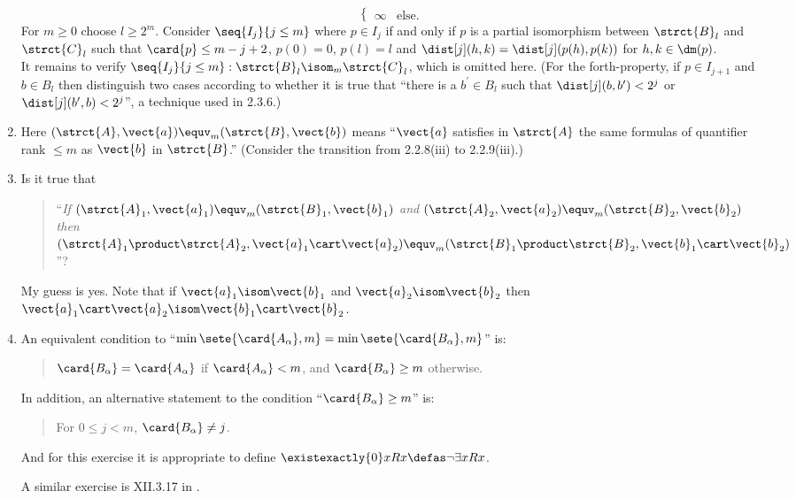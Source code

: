 \begin{enumerate}[1.]
\[\begin{cases}
\infty & \mbox{else}.
\end{cases}
\]
For $m \geq 0$ choose $l \geq 2^m$. Consider $\seq{I_j}{j \leq m}$ where $p \in I_j$ if and only if $p$ is a partial isomorphism between $\strct{B}_l$ and $\strct{C}_l$ such that $\card{p} \leq m - j + 2$, $p(0) = 0$, $p(l) = l$ and $\dist[j](h, k) = \dist[j](p(h), p(k))$ for $h, k \in \dm(p)$.
\medskip\\
It remains to verify $\seq{I_j}{j \leq m} : \strct{B}_l \isom_m \strct{C}_l$, which is omitted here. (For the forth-property, if $p \in I_{j + 1}$ and $b \in B_l$ then distinguish two cases according to whether it is true that ``there is a $b^\prime \in B_l$ such that $\dist[j](b, b^\prime) < 2^j$ or $\dist[j](b^\prime, b) < 2^j$'', a technique used in 2.3.6.)
%
\item {} Here $(\strct{A}, \vect{a}) \equv_m (\strct{B}, \vect{b})$ means ``$\vect{a}$ satisfies in $\strct{A}$ the same formulas of quantifier rank $\leq m$ as $\vect{b}$ in $\strct{B}$.'' (Consider the transition from 2.2.8(iii) to 2.2.9(iii).)
%
\item {} Is it true that
\begin{quote}
``\emph{If $(\strct{A}_1, \vect{a}_1) \equv_m (\strct{B}_1, \vect{b}_1)$ and $(\strct{A}_2, \vect{a}_2) \equv_m (\strct{B}_2, \vect{b}_2)$ then $(\strct{A}_1 \product \strct{A}_2, \vect{a}_1 \cart \vect{a}_2) \equv_m (\strct{B}_1 \product \strct{B}_2, \vect{b}_1 \cart \vect{b}_2)$}''?
\end{quote}
My guess is yes. Note that if $\vect{a}_1 \isom \vect{b}_1$ and $\vect{a}_2 \isom \vect{b}_2$ then $\vect{a}_1 \cart \vect{a}_2 \isom \vect{b}_1 \cart \vect{b}_2$.
%
\item {} An equivalent condition to ``$\min\sete{\card{A_\alpha}, m} = \min\sete{\card{B_\alpha}, m}$'' is:
\begin{quote}
$\card{B_\alpha} = \card{A_\alpha}$ if $\card{A_\alpha} < m$, and $\card{B_\alpha} \geq m$ otherwise.
\end{quote}
In addition, an alternative statement to the condition ``$\card{B_\alpha} \geq m$'' is:
\begin{quote}
For $0 \leq j < m$, $\card{B_\alpha} \neq j$.
\end{quote}
And for this exercise it is appropriate to define $\existexactly{0}x Rx \defas \neg\exists x Rx$.
\begin{remark}
A similar exercise is XII.3.17 in \cite{EFT}.
\end{remark}

\end{enumerate}
